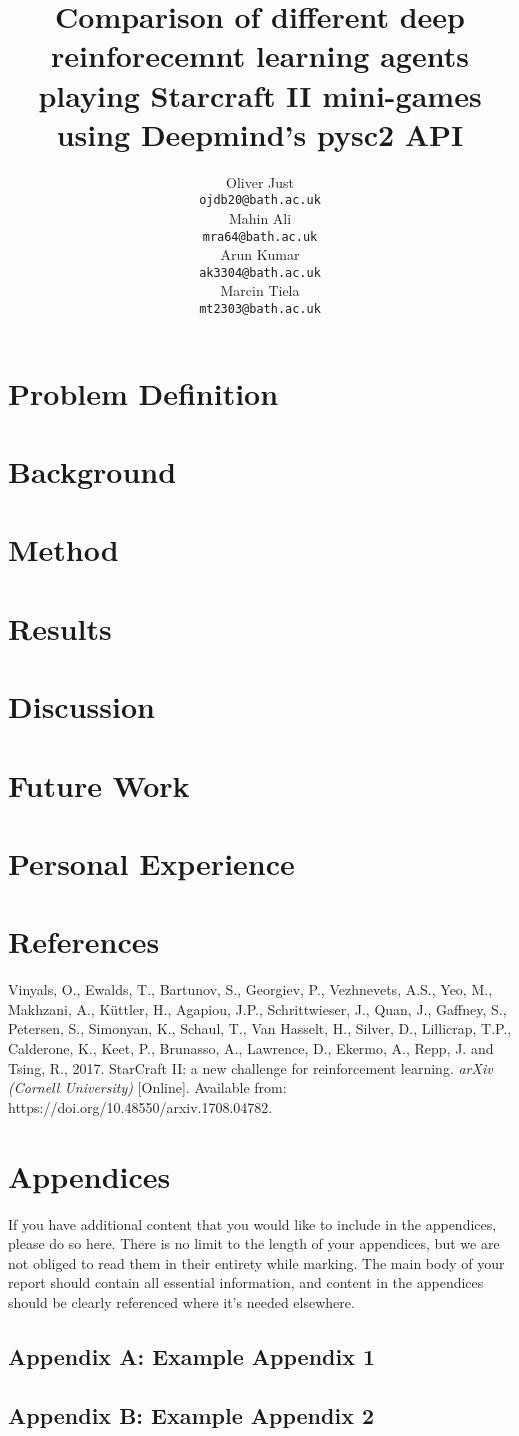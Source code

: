\documentclass{article}
\title{Comparison of different deep reinforecemnt learning agents playing Starcraft II mini-games using Deepmind's pysc2 API}
\author{
  Oliver Just\\
  \texttt{ojdb20@bath.ac.uk} \\
  \And
  Mahin Ali\\
  \texttt{mra64@bath.ac.uk} \\
  \And
  Arun Kumar\\
  \texttt{ak3304@bath.ac.uk} \\
  \And
  Marcin Tiela\\
  \texttt{mt2303@bath.ac.uk}
}
\begin{document}
\maketitle

\section{Problem Definition}

\section{Background}

\section{Method}

\section{Results}

\section{Discussion}

\section{Future Work}

\section{Personal Experience}


\section*{References}
\small
Vinyals, O., Ewalds, T., Bartunov, S., Georgiev, P., Vezhnevets, A.S., Yeo, M., Makhzani, A., Küttler, H., Agapiou, J.P., Schrittwieser, J., Quan, J., Gaffney, S., Petersen, S., Simonyan, K., Schaul, T., Van Hasselt, H., Silver, D., Lillicrap, T.P., Calderone, K., Keet, P., Brunasso, A., Lawrence, D., Ekermo, A., Repp, J. and Tsing, R., 2017. StarCraft II: a new challenge for reinforcement learning. {\it arXiv (Cornell University) } [Online]. Available from: https://doi.org/10.48550/arxiv.1708.04782.

\normalsize
\newpage
\section*{Appendices}
If you have additional content that you would like to include in the appendices, please do so here.
There is no limit to the length of your appendices, but we are not obliged to read them in their entirety while marking. The main body of your report should contain all essential information, and content in the appendices should be clearly referenced where it's needed elsewhere.
\subsection*{Appendix A: Example Appendix 1}
\subsection*{Appendix B: Example Appendix 2}
\end{document}
